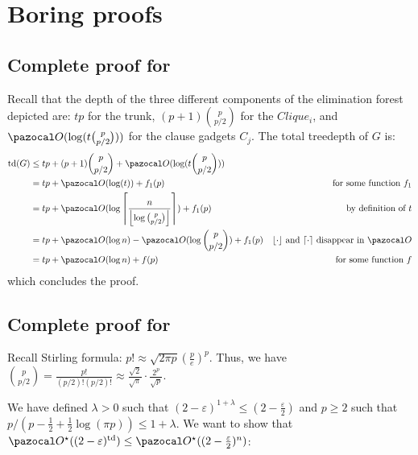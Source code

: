 \section{Boring proofs}
\label{appendix:boring-proofs}

\subsection*{Complete proof for }

Recall that the depth of the three different components of the elimination forest depicted  are: $tp$ for the trunk, $(p+1)\binom{p}{p/2}$ for the $Clique_i$, and $\O(\log(t\binom{p}{p/2}))$ for the clause gadgets $C_j$. The total treedepth of $G$ is:
\begin{align*}
    \td(G) &\leq tp + (p+1)\binom{p}{p/2} + \O(\log(t\binom{p}{p/2}))\\
    &= tp + \O(\log(t)) + f_1(p) & \text{for some function $f_1$}\\
    &= tp + \O(\log \left\lceil\frac{n}{\left\lfloor\log\binom{p}{p/2}\right\rfloor}\right\rceil) + f_1(p) & \text{by definition of $t$}\\
    &= tp + \O(\log n) - \O(\log\binom{p}{p/2}) + f_1(p) & \text{$\lfloor\cdot\rfloor$ and $\lceil\cdot\rceil$ disappear in $\O$}\\
    &= tp + \O(\log n) + f(p) & \text{for some function $f$}
\end{align*}
which concludes the proof.

\subsection*{Complete proof for }

Recall Stirling formula: $p! \approx \sqrt{2\pi p}\left(\frac{p}{e}\right)^p$. Thus, we have $\binom{p}{p/2} = \frac{p!}{(p/2)!(p/2)!}\approx \frac{\sqrt{2}}{\sqrt{\pi}}\cdot\frac{2^p}{\sqrt{p}}$.

We have defined $\lambda > 0$ such that $(2-\varepsilon)^{1 + \lambda} \leq (2 - \frac{\varepsilon}{2})$ and $p \geq 2$ such that $p/(p - \frac{1}{2} + \frac{1}{2}\log(\pi p)) \leq 1 + \lambda$. We want to show that $\O^\star((2-\varepsilon)^\td) \leq \O^\star((2-\frac{\varepsilon}{2})^n)$:

